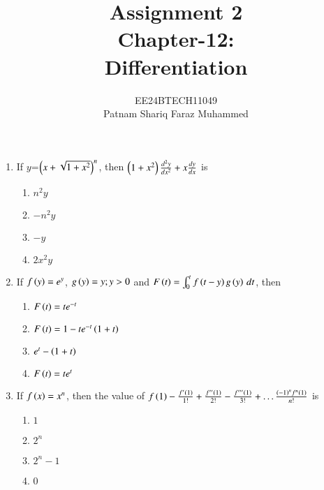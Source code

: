 \documentclass[journal]{IEEEtran}
\numberwithin{equation}{enumi}
\numberwithin{figure}{enumi}
\begin{document}


\title{Assignment 2 \\ Chapter-12: \\ Differentiation}
\author{EE24BTECH11049 \\ Patnam Shariq Faraz Muhammed}

{\let\newpage\relax\maketitle}

\begin{enumerate}

	\item
	{If $y$=$\left(x+\sqrt{1+x^{2}}\right)^{n}$, then $\left(1+x^{2}\right)\frac{d^{2}y}{dx^{2}} + x\frac{dy}{dx}$ is}

	\hfill{}
	
	\begin{multicols}{4}
		\begin{enumerate}
			\item $n^{2}y$
			\item $-n^{2}y$
			\item $-y$
			\item $2x^{2}y$
		\end{enumerate}
	\end{multicols}

	\item
	If $f\left(y\right)=e^{y}$, $g\left(y\right)=y; y>0$ and $F\left(t\right)= \int_{0}^{t}{f\left(t-y\right)g\left(y\right) \, dt}$, then

	\hfill{}

	\begin{enumerate}
		\item $F\left(t\right)=te^{-t}$
		\item $F\left(t\right)=1-te^{-t}\left(1+t\right)$
		\item $e^{t}-\left(1+t\right)$
		\item $F\left(t\right)=te^{t}$
	\end{enumerate}

	\item 
		If $f\left(x\right)=x^{n}$, then the value of $f\left(1\right)-\frac{f^{\prime}\left(1\right)}{1!}+\frac{{f^{\prime\prime}\left(1\right)}}{2!}-\frac{{f^{\prime\prime\prime}\left(1\right)}}{3!}+\dots \frac{\left(-1\right)^nf^{n}\left(1\right)}{n!}$ is

	\hfill{}
	
	\begin{multicols}{4}
		\begin{enumerate}
			\item $1$
			\item $2^{n}$
			\item $2^{n}-1$
			\item $0$
		\end{enumerate}
	\end{multicols}

\end{enumerate}
\end{document}

